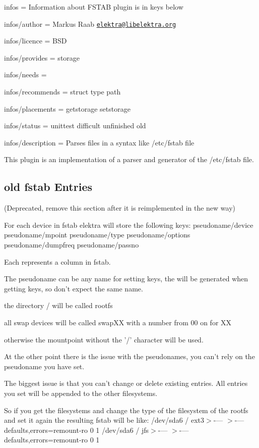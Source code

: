 
\begin{DoxyItemize}
\item infos = Information about F\+S\+T\+A\+B plugin is in keys below
\item infos/author = Markus Raab \href{mailto:elektra@libelektra.org}{\tt elektra@libelektra.\+org}
\item infos/licence = B\+S\+D
\item infos/provides = storage
\item infos/needs =
\item infos/recommends = struct type path
\item infos/placements = getstorage setstorage
\item infos/status = unittest difficult unfinished old
\item infos/description = Parses files in a syntax like /etc/fstab file
\end{DoxyItemize}

This plugin is an implementation of a parser and generator of the /etc/fstab file.

\subsection*{old fstab Entries}

(Deprecated, remove this section after it is reimplemented in the new way)

For each device in fstab elektra will store the following keys\+: pseudoname/device pseudoname/mpoint pseudoname/type pseudoname/options pseudoname/dumpfreq pseudoname/passno

Each represents a column in fstab.

The pseudoname can be any name for setting keys, the will be generated when getting keys, so don't expect the same name.

the directory / will be called rootfs

all swap devices will be called swap\+X\+X with a number from 00 on for X\+X

otherwise the mountpoint without the '/' character will be used.

At the other point there is the issue with the pseudonames, you can't rely on the pseudoname you have set.

The biggest issue is that you can't change or delete existing entries. All entries you set will be appended to the other filesystems.

So if you get the filesystems and change the type of the filesystem of the rootfs and set it again the resulting fstab will be like\+: /dev/sda6 / ext3$>$-\/--- $>$-\/---defaults,errors=remount-\/ro 0 1 /dev/sda6 / jfs$>$-\/--- $>$-\/---defaults,errors=remount-\/ro 0 1

